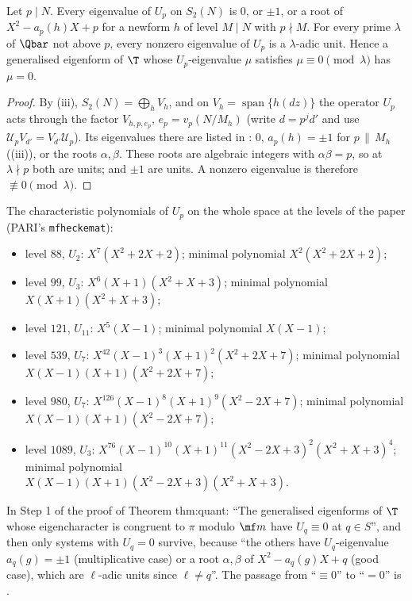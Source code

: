 \begin{corollary}\label{cor:hecke:Up-eigenvalues}
Let $p\mid N$. Every eigenvalue of $U_p$ on $S_2(N)$ is $0$, or $\pm1$, or a root of $X^2-a_p(h)X+p$ for a newform $h$ of level $M\mid N$ with $p\nmid M$. For every prime $\lambda$ of $\Qbar$
not above $p$, every nonzero eigenvalue of $U_p$ is a $\lambda$-adic unit. Hence a generalised eigenform of $\T$ whose $U_p$-eigenvalue $\mu$ satisfies $\mu\equiv0\pmod\lambda$ has $\mu=0$.
\end{corollary}

\begin{proof}
By (iii), $S_2(N)=\bigoplus_hV_h$, and on $V_h=\operatorname{span}\{h(dz)\}$ the operator $U_p$ acts through the factor $V_{h,p,e_p}$, $e_p=v_p(N/M_h)$ (write $d=p^jd'$ and use
$\mathcal U_pV_{d'}=V_{d'}\mathcal U_p$). Its eigenvalues there are listed in : $0$, $a_p(h)=\pm1$ for $p\,\|\,M_h$ ((iii)), or the roots $\alpha,\beta$. These
roots are algebraic integers with $\alpha\beta=p$, so at $\lambda\nmid p$ both are units; and $\pm1$ are units. A nonzero eigenvalue is therefore $\not\equiv0\pmod\lambda$.
\end{proof}

The characteristic polynomials of $U_p$ on the whole space at the levels of the paper (PARI's \texttt{mfheckemat}):
\begin{itemize}
\item level $88$, $U_2$: $X^7(X^2+2X+2)$; minimal polynomial $X^2(X^2+2X+2)$;
\item level $99$, $U_3$: $X^6(X+1)(X^2+X+3)$; minimal polynomial $X(X+1)(X^2+X+3)$;
\item level $121$, $U_{11}$: $X^5(X-1)$; minimal polynomial $X(X-1)$;
\item level $539$, $U_7$: $X^{42}(X-1)^3(X+1)^2(X^2+2X+7)$; minimal polynomial $X(X-1)(X+1)(X^2+2X+7)$;
\item level $980$, $U_7$: $X^{126}(X-1)^8(X+1)^9(X^2-2X+7)$; minimal polynomial $X(X-1)(X+1)(X^2-2X+7)$;
\item level $1089$, $U_3$: $X^{76}(X-1)^{10}(X+1)^{11}(X^2-2X+3)^2(X^2+X+3)^4$; minimal polynomial\\ $X(X-1)(X+1)(X^2-2X+3)(X^2+X+3)$.
\end{itemize}

\begin{paperlink}\label{pl:hecke:units}
In Step 1 of the proof of Theorem thm:quant: ``The generalised eigenforms of $\T$ whose eigencharacter is congruent to $\pi$ modulo $\mf m$ have $U_q\equiv0$ at $q\in S$'', and then only
systems with $U_q=0$ survive, because ``the others have $U_q$-eigenvalue $a_q(g)=\pm1$ (multiplicative case) or a root $\alpha,\beta$ of $X^2-a_q(g)X+q$ (good case), which are $\ell$-adic units since
$\ell\ne q$''. The passage from ``$\equiv0$'' to ``$=0$'' is .
\end{paperlink}

